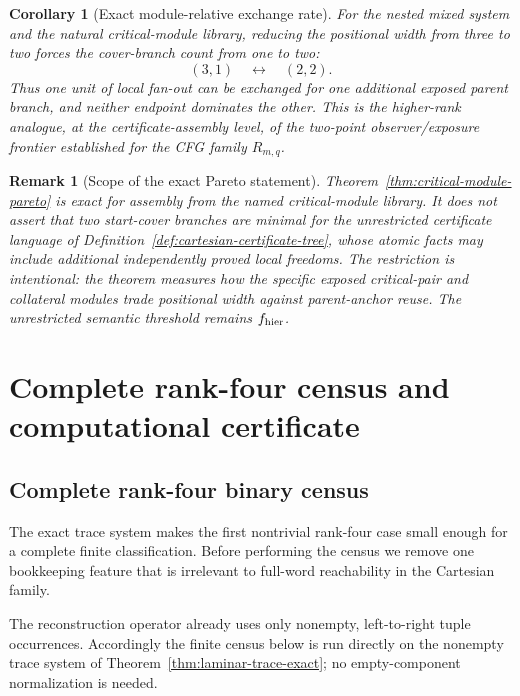 \documentclass[11pt]{article}
\newtheorem{corollary}[definition]{Corollary}
\newtheorem{remark}[definition]{Remark}
\begin{document}
\begin{corollary}[Exact module-relative exchange rate]
\label{cor:exact-width-anchor-exchange}
For the nested mixed system and the natural critical-module library, reducing
the positional width from three to two forces the cover-branch count from one
to two:
\[
 \boxed{(3,1)\quad\longleftrightarrow\quad(2,2).}
\]
Thus one unit of local fan-out can be exchanged for one additional exposed
parent branch, and neither endpoint dominates the other.  This is the
higher-rank analogue, at the certificate-assembly level, of the two-point
observer/exposure frontier established for the CFG family $R_{m,q}$.
\end{corollary}

\begin{remark}[Scope of the exact Pareto statement]
Theorem~\ref{thm:critical-module-pareto} is exact for assembly from the named
critical-module library.  It does not assert that two start-cover branches are
minimal for the unrestricted certificate language of
Definition~\ref{def:cartesian-certificate-tree}, whose atomic facts may include
additional independently proved local freedoms.  The restriction is
intentional: the theorem measures how the specific exposed critical-pair and
collateral modules trade positional width against parent-anchor reuse.  The
unrestricted semantic threshold remains $f_{\rm hier}$.
\end{remark}






\section{Complete rank-four census and computational certificate}
\label{app:rank4-census}

\subsection{Complete rank-four binary census}
\label{subsec:rank4-census}

The exact trace system makes the first nontrivial rank-four case small enough
for a complete finite classification.  Before performing the census we remove
one bookkeeping feature that is irrelevant to full-word reachability in the
Cartesian family.

The reconstruction operator already uses only nonempty,
left-to-right tuple occurrences.  Accordingly the finite census below is run
directly on the nonempty trace system of
Theorem~\ref{thm:laminar-trace-exact}; no empty-component normalization is
needed.
\end{document}
